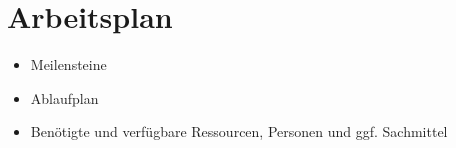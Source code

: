 \section{Arbeitsplan}
\label{sec:Arbeitsplan}
\begin{itemize}
  \item Meilensteine
  \item Ablaufplan
  \item Benötigte und verfügbare Ressourcen, Personen und ggf. Sachmittel 
\end{itemize}